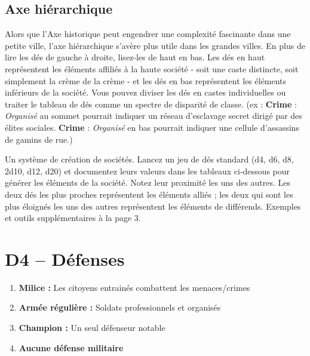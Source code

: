 \documentclass{article}
\begin{document}
\subsection*{Axe hiérarchique}
Alors que l'Axe historique peut engendrer une complexité fascinante dans une petite ville, l'axe hiérarchique s'avère plus utile dans les grandes villes. En plus de lire les dés de gauche à droite, lisez-les de haut en bas. Les dés en haut représentent les éléments affiliés à la haute société - soit une caste distincte, soit simplement la crème de la crème - et les dés en bas représentent les éléments inférieurs de la société. Vous pouvez diviser les dés en castes individuelles ou traiter le tableau de dés comme un spectre de disparité de classe. (ex : \textbf{Crime} : \textit{Organisé} au sommet pourrait indiquer un réseau d'esclavage secret dirigé par des élites sociales. \textbf{Crime} : \textit{Organisé} en bas pourrait indiquer une cellule d'assassins de gamins de rue.)


\clearpage

Un système de création de sociétés. Lancez un jeu de dés standard (d4, d6, d8, 2d10, d12, d20) et documentez leurs valeurs dans les tableaux ci-dessous pour générer les éléments de la société. Notez leur proximité les uns des autres. Les deux dés les plus proches représentent les éléments alliés ; les deux qui sont les plus éloignés les uns des autres représentent les éléments de différends. Exemples et outils supplémentaires à la page 3. 


\section*{D4 -- Défenses}
\begin{enumerate}
	\item \textbf{Milice :} Les citoyens entrainés combattent les menaces/crimes
	\item \textbf{Armée régulière :} Soldats professionnels et organisés
	\item \textbf{Champion :} Un seul défenseur notable
	\item \textbf{Aucune défense militaire}
\end{enumerate}
\end{document}
